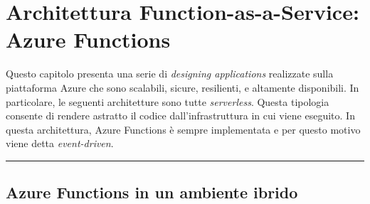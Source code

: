\documentclass[a4paper]{article}
\newcommand{\longline}{\noindent\rule{\textwidth}{0.4pt}}
\begin{document}
	\section{Architettura Function-as-a-Service: Azure Functions}
	
	Questo capitolo presenta una serie di \emph{designing applications} realizzate sulla piattaforma Azure che sono scalabili, sicure, resilienti, e altamente disponibili. In particolare, le seguenti architetture sono tutte \emph{serverless}. Questa tipologia consente di rendere astratto il codice dall'infrastruttura in cui viene eseguito. In questa architettura, Azure Functions è sempre implementata e per questo motivo viene detta \emph{event-driven}.
	
	\longline
	
	\subsection{Azure Functions in un ambiente ibrido}
	
\end{document}
